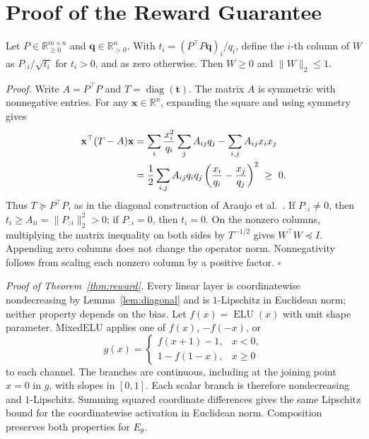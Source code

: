 \onecolumn
\useRomanappendicesfalse
\appendices

\section{Proof of the Reward Guarantee}
\label{app:proof}

\begin{lemma}
\label{lem:diagonal}
Let $P\in\mathbb R_{\geq0}^{m\times n}$ and $\mathbf q\in\mathbb R_{>0}^{n}$.
With $t_i=(P^\top P\mathbf q)_i/q_i$, define the $i$-th column of $W$
as $P_{:i}/\sqrt{t_i}$ for $t_i>0$, and as zero otherwise.
Then $W\geq 0$ and $\|W\|_2\leq 1$.
\end{lemma}

\noindent\emph{Proof.}
Write $A=P^\top P$ and $T=\operatorname{diag}(\mathbf t)$.
The matrix $A$ is symmetric with nonnegative entries. For any
$\mathbf x\in\mathbb R^n$, expanding the square and using symmetry gives
\begin{align}
\mathbf x^\top(T-A)\mathbf x
&= \sum_i \frac{x_i^2}{q_i}\sum_j A_{ij}q_j
   - \sum_{i,j} A_{ij}x_i x_j \notag\\
&= \frac12\sum_{i,j}A_{ij}q_i q_j
       \left(\frac{x_i}{q_i}-\frac{x_j}{q_j}\right)^2
\ \geq\ 0.
\label{eq:diagonal_proof}
\end{align}
Thus $T\succeq P^\top P$, as in the diagonal construction of
Araujo et al.~\cite{araujo2023unified}. If $P_{:i}\neq 0$, then
$t_i\geq A_{ii}=\|P_{:i}\|_2^2>0$; if $P_{:i}=0$, then $t_i=0$.
On the nonzero columns, multiplying the matrix inequality on both sides by
$T^{-1/2}$ gives $W^\top W\preceq I$. Appending zero columns does not
change the operator norm. Nonnegativity follows from scaling each
nonzero column by a positive factor. \hfill$\square$

\medskip
\noindent\emph{Proof of Theorem~\ref{thm:reward}.}
Every linear layer is coordinatewise nondecreasing by Lemma~\ref{lem:diagonal}
and is $1$-Lipschitz in Euclidean norm; neither property depends on the bias.
Let $f(x)=\operatorname{ELU}(x)$ with unit shape parameter. MixedELU applies
one of $f(x)$, $-f(-x)$, or
\[
g(x)=
\begin{cases}
 f(x+1)-1, & x<0,\\
 1-f(1-x), & x\geq 0
\end{cases}
\]
to each channel. The branches are continuous, including at the joining
point $x=0$ in $g$, with slopes in $[0,1]$. Each scalar branch is therefore
nondecreasing and $1$-Lipschitz. Summing squared coordinate differences
gives the same Lipschitz bound for the coordinatewise activation in
Euclidean norm. Composition preserves both properties for $E_\theta$.

